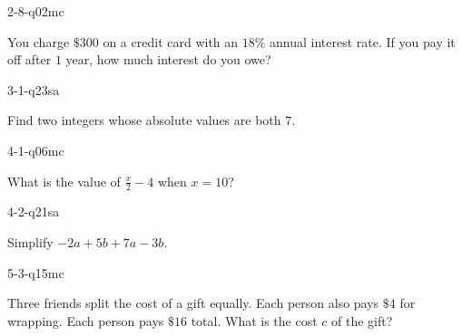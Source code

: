 \begin{practiceQuestion}{2-8-q02}{mc}
\begin{questionText}
You charge $\$300$ on a credit card with an $18\%$ annual interest rate. If you pay it off after $1$ year, how much interest do you owe?
\end{questionText}
\end{practiceQuestion}

\begin{practiceQuestion}{3-1-q23}{sa}
\begin{questionText}
Find two integers whose absolute values are both $7$.
\end{questionText}
\end{practiceQuestion}

\begin{practiceQuestion}{4-1-q06}{mc}
\begin{questionText}
What is the value of $\frac{x}{2} - 4$ when $x = 10$?
\end{questionText}
\end{practiceQuestion}

\begin{practiceQuestion}{4-2-q21}{sa}
\begin{questionText}
Simplify $-2a + 5b + 7a - 3b$.
\end{questionText}
\end{practiceQuestion}

\begin{practiceQuestion}{5-3-q15}{mc}
\begin{questionText}
Three friends split the cost of a gift equally. Each person also pays $\$4$ for wrapping. Each person pays $\$16$ total. What is the cost $c$ of the gift?
\end{questionText}
\end{practiceQuestion}

